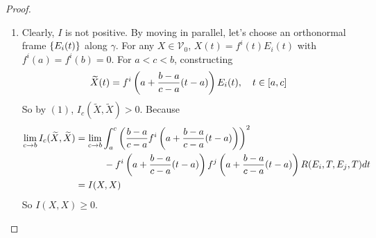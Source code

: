 \begin{enumerate}[label=\arabic{*}.]
\begin{proof}
\begin{enumerate}[label=(\arabic{*})]
			\item Clearly, $I$ is not positive. By moving in parallel, let's choose an orthonormal frame $\left\{E_i(t)\right\}$ along $\gamma$. For any $X \in \mathcal{V}_0$, $X(t)=f^i(t)E_i(t)$ with $f^i(a) = f^i(b) = 0$. For $a < c < b$, constructing
			\begin{equation*}
				\widetilde{X}(t) = f^i\left(a+\frac{b-a}{c-a}(t-a)\right)E_i(t),\quad t \in [a,c]
			\end{equation*}
			So by $(1)$, $I_c(\widetilde{X},\widetilde{X}) > 0$. Because
			\begin{equation*}
				\begin{aligned}
					\lim_{c \rightarrow b}I_c(\widetilde{X},\widetilde{X}) &= \lim_{c \rightarrow b} \int_a^c \left(\frac{b-a}{c-a}f^i\left(a+\frac{b-a}{c-a}(t-a)\right)\right)^2 \\
					&\quad\quad\quad- f^i\left(a+\frac{b-a}{c-a}(t-a)\right)f^j\left(a+\frac{b-a}{c-a}(t-a)\right)R(E_i,T,E_j,T)dt\\
					&=I(X,X)
				\end{aligned}
			\end{equation*}
			So $I(X,X) \geq 0$.


\end{enumerate}
\end{proof}
\end{enumerate}
